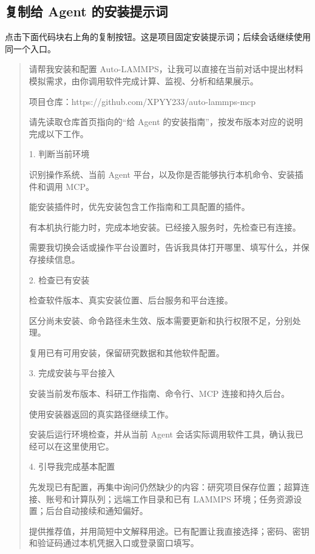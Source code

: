 \documentclass[11pt,a4paper]{ctexart}
\begin{document}
\subsection{复制给 Agent 的安装提示词}


点击下面代码块右上角的复制按钮。这是项目固定安装提示词；后续会话继续使用同一个入口。



\begin{quote}\small
请帮我安装和配置 Auto-LAMMPS，让我可以直接在当前对话中提出材料模拟需求，由你调用软件完成计算、监视、分析和结果展示。\par


项目仓库：https:/\allowbreak{}/\allowbreak{}github.com/\allowbreak{}XPYY233/\allowbreak{}auto-lammps-mcp\par


请先读取仓库首页指向的“给 Agent 的安装指南”，按发布版本对应的说明完成以下工作。\par


1. 判断当前环境\par
识别操作系统、当前 Agent 平台，以及你是否能够执行本机命令、安装插件和调用 MCP。\par
能安装插件时，优先安装包含工作指南和工具配置的插件。\par
有本机执行能力时，完成本地安装。已经接入服务时，先检查已有连接。\par
需要我切换会话或操作平台设置时，告诉我具体打开哪里、填写什么，并保存接续信息。\par


2. 检查已有安装\par
检查软件版本、真实安装位置、后台服务和平台连接。\par
区分尚未安装、命令路径未生效、版本需要更新和执行权限不足，分别处理。\par
复用已有可用安装，保留研究数据和其他软件配置。\par


3. 完成安装与平台接入\par
安装当前发布版本、科研工作指南、命令行、MCP 连接和持久后台。\par
使用安装器返回的真实路径继续工作。\par
安装后运行环境检查，并从当前 Agent 会话实际调用软件工具，确认我已经可以在这里使用它。\par


4. 引导我完成基本配置\par
先发现已有配置，再集中询问仍然缺少的内容：研究项目保存位置；超算连接、账号和计算队列；远端工作目录和已有 LAMMPS 环境；任务资源设置；后台自动接续和通知偏好。\par
提供推荐值，并用简短中文解释用途。已有配置让我直接选择；密码、密钥和验证码通过本机凭据入口或登录窗口填写。\par



\end{quote}
\end{document}
